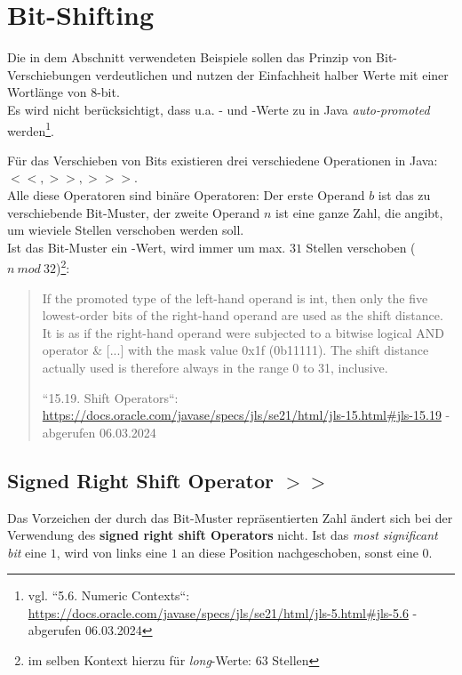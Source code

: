 \section{Bit-Shifting}

\begin{tcolorbox}[colback=red!20,color=white,title={Hinweis}]
    Die in dem Abschnitt verwendeten Beispiele sollen das Prinzip von Bit-Verschiebungen verdeutlichen und nutzen der Einfachheit halber Werte mit einer Wortlänge von 8-bit.\\
    Es wird nicht berücksichtigt, dass u.a. - und -Werte zu  in Java \textit{auto-promoted} werden\footnote{
        vgl. ``5.6. Numeric Contexts``: \url{https://docs.oracle.com/javase/specs/jls/se21/html/jls-5.html#jls-5.6} - abgerufen 06.03.2024
    }.
\end{tcolorbox}

    Für das Verschieben von Bits existieren drei verschiedene Operationen in Java: $<<, >>, >>>$.\\
Alle diese Operatoren sind binäre Operatoren: Der erste Operand $b$ ist das zu verschiebende Bit-Muster, der zweite Operand $n$ ist eine ganze Zahl, die angibt, um wieviele Stellen verschoben werden soll.\\

Ist das Bit-Muster ein -Wert, wird immer um max. $31$ Stellen verschoben ($n\ mod\ 32$)\footnote{im selben Kontext hierzu für \textit{long}-Werte: $63$ Stellen}:

\blockquote[{``15.19. Shift Operators``: \url{https://docs.oracle.com/javase/specs/jls/se21/html/jls-15.html#jls-15.19} - abgerufen 06.03.2024}]{
    If the promoted type of the left-hand operand is int, then only the five lowest-order bits of the right-hand operand are used as the shift distance. It is as if the right-hand operand were subjected to a bitwise logical AND operator & [...] with the mask value 0x1f (0b11111). The shift distance actually used is therefore always in the range 0 to 31, inclusive.
}

\subsection{Signed Right Shift Operator $>>$}

\begin{tcolorbox}
Das Vorzeichen der durch das Bit-Muster repräsentierten Zahl ändert sich bei der Verwendung des \textbf{signed right shift Operators} nicht.
Ist das \textit{most significant bit} eine $1$, wird von links eine $1$ an diese Position nachgeschoben, sonst eine $0$.\\
\end{tcolorbox}

